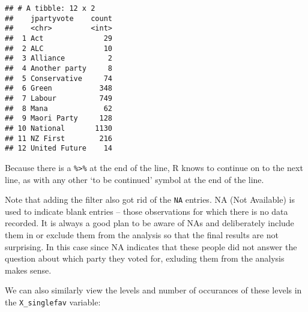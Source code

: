 \documentclass[]{article}
\newenvironment{Shaded}{\begin{snugshade}}{\end{snugshade}}
\newcommand{\KeywordTok}[1]{\textcolor[rgb]{0.13,0.29,0.53}{\textbf{#1}}}
\newcommand{\DataTypeTok}[1]{\textcolor[rgb]{0.13,0.29,0.53}{#1}}
\newcommand{\StringTok}[1]{\textcolor[rgb]{0.31,0.60,0.02}{#1}}
\newcommand{\OperatorTok}[1]{\textcolor[rgb]{0.81,0.36,0.00}{\textbf{#1}}}
\newcommand{\NormalTok}[1]{#1}
\begin{document}
\begin{Shaded}
\end{Shaded}

\begin{verbatim}
## # A tibble: 12 x 2
##    jpartyvote    count
##    <chr>         <int>
##  1 Act              29
##  2 ALC              10
##  3 Alliance          2
##  4 Another party     8
##  5 Conservative     74
##  6 Green           348
##  7 Labour          749
##  8 Mana             62
##  9 Maori Party     128
## 10 National       1130
## 11 NZ First        216
## 12 United Future    14
\end{verbatim}

Because there is a \texttt{\%\textgreater{}\%} at the end of the line, R
knows to continue on to the next line, as with any other `to be
continued' symbol at the end of the line.

Note that adding the filter also got rid of the \texttt{NA} entries. NA
(Not Available) is used to indicate blank entries -- those observations
for which there is no data recorded. It is always a good plan to be
aware of NAs and deliberately include them in or exclude them from the
analysis so that the final results are not surprising. In this case
since NA indicates that these people did not answer the question about
which party they voted for, exluding them from the analysis makes sense.

We can also similarly view the levels and number of occurances of these
levels in the \texttt{X\_singlefav} variable:

\begin{Shaded}
\end{Shaded}
\end{document}
